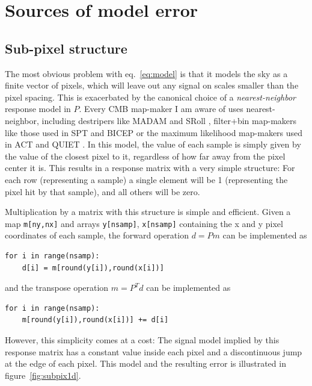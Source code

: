 \documentclass{article}
\newcommand{\code}[1]{\texttt{#1}}
\begin{document}
\section{Sources of model error}
\subsection{Sub-pixel structure}
The most obvious problem with eq.~\ref{eq:model} is that it models the sky as a
finite vector of pixels, which will leave out any signal on scales smaller than the
pixel spacing. This is exacerbated by the canonical choice of a \emph{nearest-neighbor} response
model in $P$. Every CMB map-maker I am aware of uses nearest-neighbor, including destripers like
MADAM \citep{madam/2010} and SRoll \citep{planck/hfi/maps/2018}, filter+bin map-makers like those
used in SPT \citep{spt/maps/2011} and BICEP \citep{bicep2a/2014} or the maximum likelihood map-makers
used in ACT \citep{act-2017} and QUIET \citep{quiet-gal/2015}. In this model, the value of
each sample is simply given by the value of the
closest pixel to it, regardless of how far away from the pixel center it is. This results
in a response matrix with a very simple structure: For each row (representing a sample)
a single element will be 1 (representing the pixel hit by that sample), and all others
will be zero.

Multiplication by a matrix with this structure is simple and efficient.
Given a map \code{m[ny,nx]} and arrays \code{y[nsamp]}, \code{x[nsamp]} containing the x and y pixel coordinates
of each sample, the forward operation $d = Pm$ can be implemented as
\begin{lstlisting}
for i in range(nsamp):
	d[i] = m[round(y[i]),round(x[i])]
\end{lstlisting}
and the transpose operation $m = P^Td$ can be implemented as
\begin{lstlisting}
for i in range(nsamp):
	m[round(y[i]),round(x[i])] += d[i]
\end{lstlisting}
However, this simplicity comes at a cost: The signal model implied by this
response matrix has a constant value inside each pixel and a discontinuous jump
at the edge of each pixel. This model and the resulting error is illustrated in figure~\ref{fig:subpix1d}.
\end{document}
